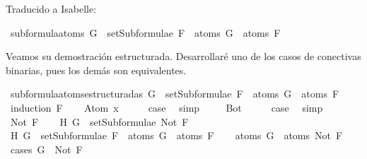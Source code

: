 \begin{isabellebody}
\begin{isamarkuptext}
Traducido a Isabelle:%
\end{isamarkuptext}\isamarkuptrue%
\isamarkupfalse%
\ subformula{\isacharunderscore}atoms{\isacharcolon}\ {\isachardoublequoteopen}G\ {\isasymin}\ setSubformulae\ F\ {\isasymLongrightarrow}\ atoms\ G\ {\isasymsubseteq}\ atoms\ F{\isachardoublequoteclose}\isanewline
%
\isadelimproof
\ \ %
\endisadelimproof
%
\isatagproof
{}\isamarkupfalse%
%
\endisatagproof
{\isafoldproof}%
%
\isadelimproof
%
\endisadelimproof
%
\begin{isamarkuptext}%
Veamos su demostración estructurada. Desarrollaré uno de los casos de conectivas binarias,
pues los demás son equivalentes.%
\end{isamarkuptext}\isamarkuptrue%
\isamarkupfalse%
\ subformula{\isacharunderscore}atoms{\isacharunderscore}estructurada{\isacharunderscore}s{\isacharcolon}\ {\isachardoublequoteopen}G\ {\isasymin}\ setSubformulae\ F\ {\isasymLongrightarrow}\ atoms\ G\ {\isasymsubseteq}\ atoms\ F{\isachardoublequoteclose}\isanewline
%
\isadelimproof
%
\endisadelimproof
%
\isatagproof
{}\isamarkupfalse%
\ {\isacharparenleft}induction\ F{\isacharparenright}\isanewline
\ \ \isamarkupfalse%
\ {\isacharparenleft}Atom\ x{\isacharparenright}\isanewline
\ \ \isamarkupfalse%
\ \isamarkupfalse%
\ {\isacharquery}case\ \isamarkupfalse%
\ simp\ \isanewline
{}\isamarkupfalse%
\isanewline
\ \ \isamarkupfalse%
\ Bot\isanewline
\ \ \isamarkupfalse%
\ \isamarkupfalse%
\ {\isacharquery}case\ \isamarkupfalse%
\ simp\isanewline
{}\isamarkupfalse%
\isanewline
\ \ \isamarkupfalse%
\ {\isacharparenleft}Not\ F{\isacharparenright}\isanewline
\ \ \isamarkupfalse%
\ H{}{\isacharcolon}\ {\isachardoublequoteopen}G\ {\isasymin}\ setSubformulae\ {\isacharparenleft}Not\ F{\isacharparenright}{\isachardoublequoteclose}\isanewline
\ \ \isamarkupfalse%
\ H{}{\isacharcolon}\ {\isachardoublequoteopen}G\ {\isasymin}\ setSubformulae\ F\ {\isasymLongrightarrow}\ atoms\ G\ {\isasymsubseteq}\ atoms\ F{\isachardoublequoteclose}\isanewline
\ \ \isamarkupfalse%
\ {\isachardoublequoteopen}atoms\ G\ {\isasymsubseteq}\ atoms\ {\isacharparenleft}Not\ F{\isacharparenright}{\isachardoublequoteclose}\isanewline
\ \ \isamarkupfalse%
\ {\isacharparenleft}cases\ {\isachardoublequoteopen}G\ {\isacharequal}\ Not\ F{\isachardoublequoteclose}{\isacharparenright}\isanewline

\end{isabellebody}
